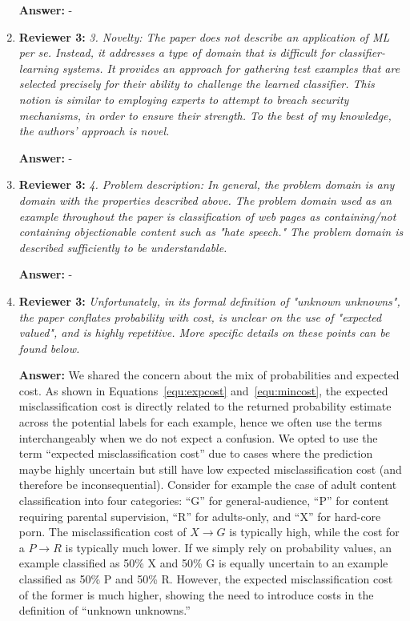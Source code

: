 \documentclass[letterpaper]{article}
\begin{document}
\begin{enumerate}
\textbf{Answer:} -

\item \textbf{Reviewer 3:} \emph{ 3. Novelty: The paper does not describe an application of ML per se.  Instead, it addresses a type of domain that is difficult for classifier-learning systems.  It provides an approach for gathering test examples that are selected precisely for their ability to challenge the learned classifier.  This notion is similar to employing experts to attempt to breach security mechanisms, in order to ensure their strength.  To the best of my knowledge, the authors' approach is novel.}

\textbf{Answer:} -

\item \textbf{Reviewer 3:} \emph{ 4. Problem description: In general, the problem domain is any domain with the properties described above.  The problem domain used as an example throughout the paper is classification of web pages as containing/not containing objectionable content such as "hate speech."  The problem domain is described sufficiently to be understandable.}

\textbf{Answer:} -

\item \label{whycost} \textbf{Reviewer 3:} \emph{ Unfortunately, in its formal definition of "unknown unknowns", the paper conflates probability with cost, is unclear on the use of "expected valued", and is highly repetitive.  More specific details on these points can be found below.}

\textbf{Answer:} We shared the concern about the mix of probabilities and expected cost. As shown in Equations~\ref{equ:expcost} and~\ref{equ:mincost}, the expected misclassification cost is directly related to the returned probability estimate across the potential labels for each example, hence we often use the terms interchangeably when we do not expect a confusion. We opted to use the term ``expected misclassification cost'' due to cases where the prediction maybe highly uncertain but still have low expected misclassification cost (and therefore be inconsequential). Consider for example the case of adult content classification into four categories: ``G'' for general-audience, ``P'' for content requiring parental supervision, ``R'' for adults-only, and ``X'' for hard-core porn. The misclassification cost of $X \rightarrow G$ is typically high, while the cost for a $P \rightarrow R$ is typically much lower. If we simply rely on probability values, an example classified as 50\% X and 50\% G is equally uncertain to an example classified as 50\% P and 50\% R. However, the expected misclassification cost of the former is much higher, showing the need to introduce costs in the definition of ``unknown unknowns.''


\end{enumerate}
\end{document}
